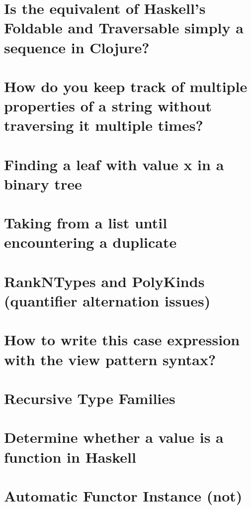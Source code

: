\documentclass{book}
\begin{document}
\section{Is the equivalent of Haskell's Foldable and Traversable simply a sequence in Clojure?}


\section{How do you keep track of multiple properties of a string without traversing it multiple times?}


\section{Finding a leaf with value x in a binary tree}


\section{Taking from a list until encountering a duplicate}


\section{RankNTypes and PolyKinds (quantifier alternation issues)}


\section{How to write this case expression with the view pattern syntax?}


\section{Recursive Type Families}


\section{Determine whether a value is a function in Haskell}


\section{Automatic Functor Instance (not)}

\end{document}

